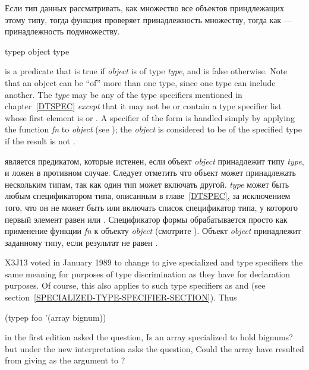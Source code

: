 Если тип данных рассматривать, как множество все объектов приндлежащих этому
типу, тогда функция  проверяет принадлежность множеству, тогда как
 --- принадлежность подмножеству.

\begin{defun}[Function]
typep object type

 is a predicate that
is true if \emph{object} is of type \emph{type}, and is false otherwise.
Note that an object can be ``of'' more than one type, since one type can
include another.  The \emph{type} may be any of the type specifiers
mentioned in chapter~\ref{DTSPEC} \emph{except} that it may not
be or contain a type specifier list whose first element is 
or .
A specifier of the form  is handled simply
by applying the function \emph{fn} to \emph{object}
(see ); the \emph{object} is considered
to be of the specified type if the result is not {\false}.

 является предикатом, которые истенен, если объект \emph{object}
принадлежит типу \emph{type}, и ложен в противном случае.
Следует отметить что объект может принадлежать нескольким типам, так как один
тип может включать другой. \emph{type} может быть любым спецификатором типа,
описанным в главе~\ref{DTSPEC}, за исключением того, что он не может быть или
включать список спецификатор типа, у которого первый элемент равен
 или .
Спецификатор формы  обрабатывается просто как применение
функции \emph{fn} к объекту \emph{object} (смотрите ). Объект
\emph{object} принадлежит заданному типу, если результат не равен {\false}.

\begin{new}
X3J13 voted in January 1989
to change  to give specialized
 and  type specifiers the same meaning for
purposes of type discrimination as they have for declaration purposes.
Of course, this also applies to such type specifiers as 
and 
(see section~\ref{SPECIALIZED-TYPE-SPECIFIER-SECTION}).
Thus
\begin{lisp}
(typep foo '(array bignum))
\end{lisp}
in the first edition asked the question, Is  an array
specialized to hold bignums? but under the new interpretation
asks the question, Could the array  have resulted from
giving  as the  argument
to ?
\end{new}
\end{defun}

